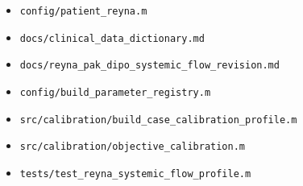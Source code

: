 \documentclass[11pt,a4paper]{article}
\begin{document}
\begin{itemize}[leftmargin=1.5em]
    \item \texttt{config/patient\_reyna.m}
    \item \texttt{docs/clinical\_data\_dictionary.md}
    \item \texttt{docs/reyna\_pak\_dipo\_systemic\_flow\_revision.md}
    \item \texttt{config/build\_parameter\_registry.m}
    \item \texttt{src/calibration/build\_case\_calibration\_profile.m}
    \item \texttt{src/calibration/objective\_calibration.m}
    \item \texttt{tests/test\_reyna\_systemic\_flow\_profile.m}
\end{itemize}
\end{document}
